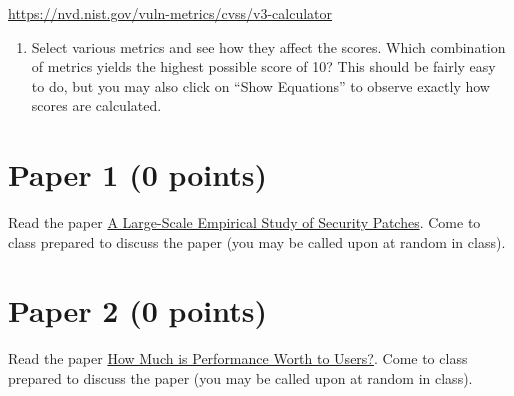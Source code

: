 \documentclass[11pt]{article}
\begin{document}
\noindent \href{https://nvd.nist.gov/vuln-metrics/cvss/v3-calculator}{https://nvd.nist.gov/vuln-metrics/cvss/v3-calculator}

\begin{enumerate}[resume]
    \item Select various metrics and see how they affect the scores. Which combination of metrics yields the highest possible score of 10? This should be fairly easy to do, but you may also click on ``Show Equations'' to observe exactly how scores are calculated.
\end{enumerate}


\section*{Paper 1 (0 points)}

Read the paper \href{https://dl.acm.org/doi/abs/10.1145/3133956.3134072}{A Large-Scale Empirical Study of Security Patches}. 
Come to class prepared to discuss the paper (you may be called upon at random in class).

\section*{Paper 2 (0 points)}

Read the paper \href{https://dl.acm.org/doi/10.1145/3587135.3592194}{How Much is Performance Worth to Users?}. 
Come to class prepared to discuss the paper (you may be called upon at random in class).
\end{document}
